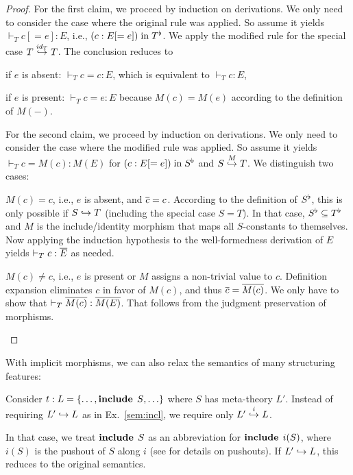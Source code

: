 \begin{proof}
For the first claim, we proceed by induction on derivations.
We only need to consider the case where the original rule was applied.
So assume it yields $\vdash_T c[=e]:E$, i.e., $(c:E[=e]) \minn \flt{T}$.
We apply the modified rule for the special case $\ipc{\id{T}}{T}{T}$.
The conclusion reduces to
\begin{compactitem}
 \item if $e$ is absent: $\vdash_T c=c:E$, which is equivalent to $\vdash_T c:E$,
 \item if $e$ is present: $\vdash_T c=e:E$ because $M(c)=M(e)$ according to the definition of $M(-)$.
\end{compactitem}

For the second claim, we proceed by induction on derivations.
We only need to consider the case where the modified rule was applied.
So assume it yields $\vdash_T c=M(c):M(E)$ for $(c:E[=e]) \minn \flt{S}$ and $\ipc{M}{S}{T}$.
We distinguish two cases:
\begin{compactitem}
 \item $M(c)=c$, i.e., $e$ is absent, and $\ov{c}=c$.
   According to the definition of $\flt{S}$, this is only possible if $S\harr T$ (including the special case $S=T$).
   In that case, $\flt{S}\sq\flt{T}$ and $M$ is the include/identity morphism that maps all $S$-constants to themselves.
   Now applying the induction hypothesis to the well-formedness derivation of $E$ yields $\vdash_T c:\ov{E}$ as needed.
 \item $M(c)\neq c$, i.e., $e$ is present or $M$ assigns a non-trivial value to $c$.
  Definition expansion eliminates $c$ in favor of $M(c)$, and thus $\ov{c}=\ov{M(c)}$.
  We only have to show that $\vdash_T \ov{M(c)}:\ov{M(E)}$. That follows from the judgment preservation of morphisms.
\end{compactitem}
\end{proof}


With implicit morphisms, we can also relax the semantics of many structuring features:

\begin{example}\label{impl:incl2}
Consider $t:L=\{\ldots,\icl{S},\ldots\}$ where $S$ has meta-theory $L'$.
Instead of requiring $L'\harr L$ as in Ex.~\ref{sem:incl}, we require only $\ipc{i}{L'}{L}$.

In that case, we treat $\icl{S}$ as an abbreviation for $\icl{i(S)}$, where $i(S)$ is the pushout of $S$ along $i$ (see \cite{rabe:howto:14} for details on \mmt pushouts).
If $L'\harr L$, this reduces to the original semantics.
\end{example}

